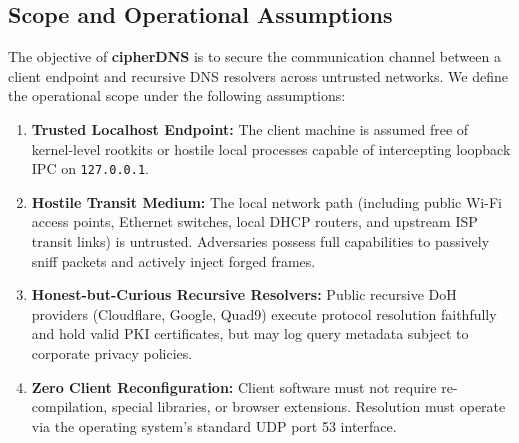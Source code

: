 \documentclass[10pt,a4paper]{article}
\begin{document}
\subsection{Scope and Operational Assumptions}
The objective of \textbf{cipherDNS} is to secure the communication channel between a client endpoint and recursive DNS resolvers across untrusted networks. We define the operational scope under the following assumptions:
\begin{enumerate}\itemsep 1pt
    \item \textbf{Trusted Localhost Endpoint:} The client machine is assumed free of kernel-level rootkits or hostile local processes capable of intercepting loopback IPC on \texttt{127.0.0.1}.
    \item \textbf{Hostile Transit Medium:} The local network path (including public Wi-Fi access points, Ethernet switches, local DHCP routers, and upstream ISP transit links) is untrusted. Adversaries possess full capabilities to passively sniff packets and actively inject forged frames.
    \item \textbf{Honest-but-Curious Recursive Resolvers:} Public recursive DoH providers (Cloudflare, Google, Quad9) execute protocol resolution faithfully and hold valid PKI certificates, but may log query metadata subject to corporate privacy policies.
    \item \textbf{Zero Client Reconfiguration:} Client software must not require re-compilation, special libraries, or browser extensions. Resolution must operate via the operating system's standard UDP port 53 interface.
\end{enumerate}
\end{document}
